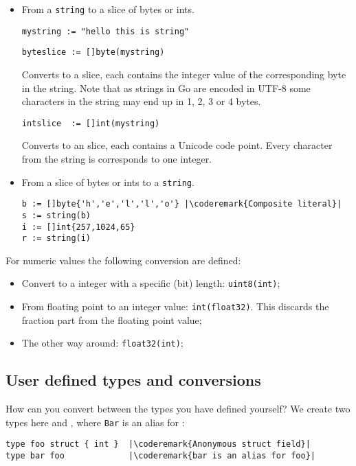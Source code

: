 \begin{itemize}
\item{
From a \lstinline{string} to a slice of bytes or ints.
\begin{lstlisting}
mystring := "hello this is string"
\end{lstlisting}

\begin{lstlisting}
byteslice := []byte(mystring)
\end{lstlisting}
Converts to a  slice, each  contains the integer value
of the corresponding byte in the string. Note that as strings in Go
are encoded in UTF-8 some characters in the string may end up in 1, 2, 3
or 4 bytes.
\begin{lstlisting}
intslice  := []int(mystring)
\end{lstlisting}
Converts to an  slice, each  contains a Unicode code
point. Every character from the string is corresponds to one integer.
}
\item{
From a slice of bytes or ints to a \lstinline{string}.
\begin{lstlisting}
b := []byte{'h','e','l','l','o'} |\coderemark{Composite literal}|
s := string(b)
i := []int{257,1024,65} 
r := string(i)
\end{lstlisting}
}
\end{itemize}
For numeric values the following conversion are defined:
\begin{itemize}
\item{Convert to a integer with a specific (bit) length: 
\lstinline{uint8(int)};}
\item{From floating point to an integer value: 
\lstinline{int(float32)}. This discards the fraction part
from the floating point value;}
\item{The other way around: \lstinline{float32(int)};}
\end{itemize}

\subsection{User defined types and conversions}
How can you convert between the types you have defined
yourself?
We create two types here  and , where
\lstinline{Bar} is an alias for :
\begin{lstlisting}
type foo struct { int }  |\coderemark{Anonymous struct field}|
type bar foo             |\coderemark{bar is an alias for foo}|
\end{lstlisting}


